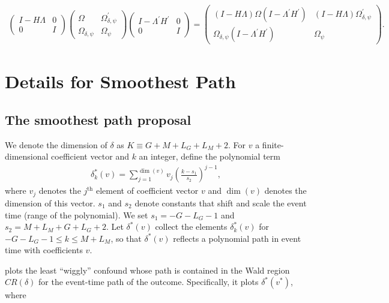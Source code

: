 \documentclass[bib]{./sty/statapress}
\begin{document}
\begin{align*}
\begin{pmatrix}I-H\Lambda & 0\\
0 & I
\end{pmatrix}\begin{pmatrix}\Omega & \Omega_{\delta,\psi}^{\prime}\\
\Omega_{\delta,\psi} & \Omega_{\psi}
\end{pmatrix}\begin{pmatrix}I-\Lambda^{\prime}H^{\prime} & 0\\
0 & I
\end{pmatrix}=\begin{pmatrix}(I-H\Lambda)\Omega(I-\Lambda^{\prime}H^{\prime}) & (I-H\Lambda)\Omega_{\delta,\psi}^{\prime}\\
\Omega_{\delta,\psi}(I-\Lambda^{\prime}H^{\prime}) & \Omega_{\psi}
\end{pmatrix}.
\end{align*}

\section{Details for Smoothest Path}
\label{sec:smoothest_path}

\subsection{The smoothest path proposal}

We denote the dimension of $\delta$ as $K \equiv G + M + L_G + L_M + 2$. For $v$ a finite-dimensional coefficient vector and $k$ an integer, define the polynomial term
\begin{align*}
\delta_k^*(v) = \sum_{j=1}^{\dim(v)} v_j (\frac{k-s_1}{s_2})^{j-1},
\end{align*}
 where $v_j$ denotes the $j^{\text{th}}$ element of coefficient vector $v$ and $\dim(v)$ denotes the dimension of this vector. $s_1$ and $s_2$ denote constants that shift and scale the event time (range of the polynomial). We set $s_1 = -G-L_G-1$ and $s_2 = M + L_M + G + L_G +2$. Let $\delta^*(v)$ collect the elements $\delta_k^*(v)$ for $-G-L_G-1 \leq k \leq M+L_M$, so that $\delta^*(v)$ reflects a polynomial path in event time with coefficients $v$.

\xtevent plots the least ``wiggly'' confound whose path is contained in the Wald region $CR(\delta)$ for the event-time path of the outcome. Specifically, it plots $\delta^*(v^*)$, where
\end{document}
